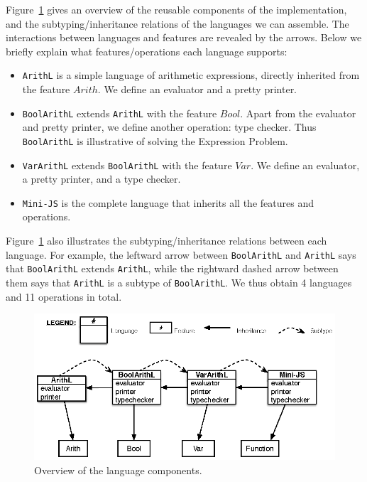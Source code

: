 Figure~\ref{fig:dependency} gives an overview of the reusable components of the
implementation, and the subtyping/inheritance relations of the languages we can
assemble. The interactions between languages and features are revealed by the
arrows. Below we briefly explain what features/operations each language supports:
\begin{itemize}
\item \lstinline{ArithL} is a simple language of arithmetic expressions,
  directly inherited from the feature $\mathit{Arith}$. We define an evaluator
  and a pretty printer.
\item \lstinline{BoolArithL} extends \lstinline{ArithL} with the feature
  $\mathit{Bool}$. Apart from the evaluator and pretty printer, we define
  another operation: type checker. Thus \lstinline{BoolArithL} is illustrative
  of solving the Expression Problem.
\item \lstinline{VarArithL} extends \lstinline{BoolArithL} with the feature
  $\mathit{Var}$. We define an evaluator, a pretty printer, and a type checker.
\item \lstinline{Mini-JS} is the complete language that inherits all the
  features and operations.
\end{itemize}

\noindent Figure~\ref{fig:dependency} also illustrates the subtyping/inheritance
relations between each language. For example, the leftward arrow between
\lstinline{BoolArithL} and \lstinline{ArithL} says that \lstinline{BoolArithL}
extends \lstinline{ArithL}, while the rightward dashed arrow between them says
that \lstinline{ArithL} is a subtype of \lstinline{BoolArithL}. We thus obtain 4
languages and 11 operations in total.

\begin{figure}[t]
  \centering
  \includegraphics{dependency.eps}
  \caption{Overview of the language components.}
  \label{fig:dependency}
\end{figure}

